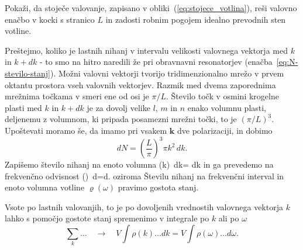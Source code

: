 \begin{definition}
 Pokaži, da stoječe valovanje, zapisano v obliki~(\ref{eq:stojece_votlina}), reši 
 valovno enačbo v kocki s stranico $L$ in zadosti robnim pogojem idealno prevodnih sten votline.
\end{definition}


Preštejmo, koliko je lastnih nihanj v intervalu velikosti valovnega
vektorja med $k$ in $k+dk$ - to smo na hitro naredili že pri obravnavni
resonatorjev (enačba~\ref{eq:N-stevilo-stanj}). Možni valovni vektorji tvorijo tridimenzionalno
mrežo v prvem oktantu prostora vseh valovnih vektorjev. Razmik med
dvema zaporednima mrežnima točkama v smeri ene od osi je $\pi/L$.
Število točk v osmini krogelne plasti med $k$ in $k+dk$ je za dovolj
velike $l$, $m$ in $n$ enako volumnu plasti, deljenemu
z volumnom, ki pripada posamezni mrežni točki, to je $(\pi/L)^{3}$.
Upoštevati moramo še, da imamo pri vsakem $\mathbf{k}$ dve polarizaciji, in dobimo
\begin{equation}
dN=\left(\frac{L}{\pi}\right)^{3}\pi k^{2}\, dk.
\label{4.2}
\end{equation}
Zapišemo število nihanj na enoto volumna
\beq
\rho(k)\, dk= dk
\label{4.3}
\eeq
in ga prevedemo na frekvenčno odvisnost
\beq
\rho(\nu)\, d\nu=d\nu.
\eeq
oziroma
Številu nihanj na frekvenčni interval in enoto volumna votline $\varrho (\omega)$ 
pravimo gostota stanj.


Vsote po lastnih valovanjih, to je po dovoljenih vrednostih valovnega vektorja $k$
lahko s pomočjo gostote stanj spremenimo v integrale po $k$ ali po $\omega$
\begin{equation}
\sum_{k}\ldots \quad \rightarrow \quad V\int\rho(k)\ldots dk=V\int\rho(\omega)\ldots d\omega.
\label{4.5}
\end{equation}


